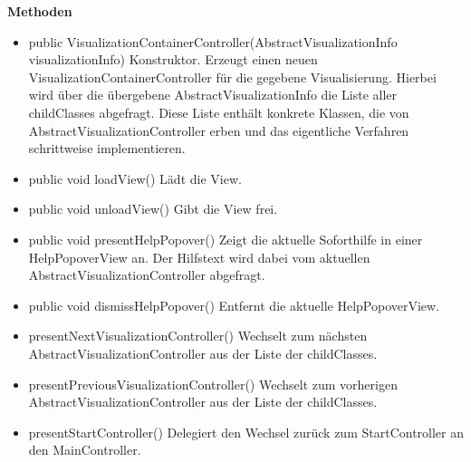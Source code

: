 \documentclass{article}
\begin{document}
      \textbf{Methoden}
      \begin{itemize}
        \item public VisualizationContainerController(AbstractVisualizationInfo visualizationInfo) \newline
        Konstruktor. Erzeugt einen neuen VisualizationContainerController für die gegebene Visualisierung.
        Hierbei wird über die übergebene AbstractVisualizationInfo die Liste aller childClasses abgefragt.
        Diese Liste enthält konkrete Klassen, die von AbstractVisualizationController erben und das eigentliche Verfahren schrittweise implementieren.
        \item public void loadView() \newline
        Lädt die View.
        \item public void unloadView() \newline
        Gibt die View frei.
        \item public void presentHelpPopover() \newline
        Zeigt die aktuelle Soforthilfe in einer HelpPopoverView an. Der Hilfstext wird dabei vom aktuellen
        AbstractVisualizationController abgefragt.
        \item public void dismissHelpPopover() \newline
        Entfernt die aktuelle HelpPopoverView.
        \item presentNextVisualizationController() \newline
        Wechselt zum nächsten AbstractVisualizationController aus der Liste der childClasses.
        \item presentPreviousVisualizationController() \newline
        Wechselt zum vorherigen AbstractVisualizationController aus der Liste der childClasses.
        \item presentStartController() \newline
        Delegiert den Wechsel zurück zum StartController an den MainController.
      \end{itemize}
\end{document}
